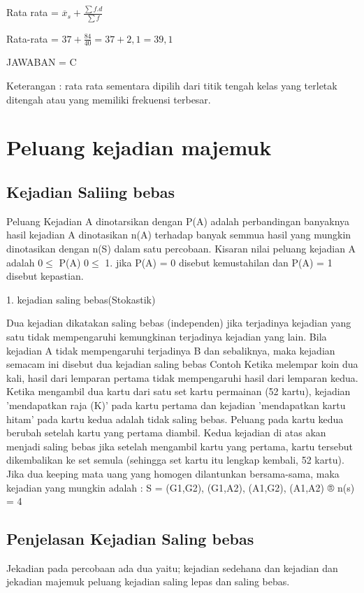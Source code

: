 \documentclass[11pt,fleqn]{book} %
\begin{document}
{Rata rata = $\overline{x}_{s} + \frac{\sum f.d}{\sum f} $

Rata-rata = $ 37 + \frac{84}{40} = 37 + 2,1 = 39,1$

JAWABAN = C

Keterangan :
rata rata sementara dipilih dari titik tengah kelas yang terletak ditengah atau yang memiliki frekuensi terbesar.



\chapter{Peluang kejadian majemuk}
\section{Kejadian Saliing bebas}

Peluang Kejadian A dinotarsikan dengan P(A) adalah perbandingan banyaknya hasil kejadian A dinotasikan n(A) terhadap banyak semmua hasil yang mungkin dinotasikan dengan n(S) dalam satu percobaan. Kisaran nilai peluang kejadian A adalah $0 \leq$ P(A) $0 \leq$ 1. jika P(A) = 0 disebut kemustahilan dan P(A) = 1 disebut kepastian.

1. kejadian saling bebas(Stokastik)

Dua kejadian dikatakan saling bebas (independen) jika terjadinya kejadian yang satu tidak mempengaruhi kemungkinan terjadinya kejadian yang lain. Bila kejadian A tidak mempengaruhi terjadinya B dan sebaliknya, maka kejadian semacam ini disebut dua kejadian saling bebas
Contoh
Ketika melempar koin dua kali, hasil dari lemparan pertama tidak mempengaruhi hasil dari lemparan kedua.
Ketika mengambil dua kartu dari satu set kartu permainan (52 kartu), kejadian 'mendapatkan raja (K)' pada kartu pertama dan kejadian 'mendapatkan kartu hitam' pada kartu kedua adalah tidak saling bebas. Peluang pada kartu kedua berubah setelah kartu yang pertama diambil. Kedua kejadian di atas akan menjadi saling bebas jika setelah mengambil
kartu yang pertama, kartu tersebut dikembalikan ke set semula (sehingga set kartu itu lengkap kembali, 52 kartu).
Jika dua keeping mata uang yang homogen dilantunkan bersama-sama, maka kejadian yang mungkin adalah : S = {(G1,G2), (G1,A2), (A1,G2), (A1,A2)} ® n(s) = 4

\section{Penjelasan Kejadian Saling bebas}
\vspace{0.5cm} 
Jekadian pada percobaan ada dua yaitu;
kejadian sedehana dan kejadian dan jekadian majemuk
peluang kejadian saling lepas dan saling bebas.

}
\end{document}
